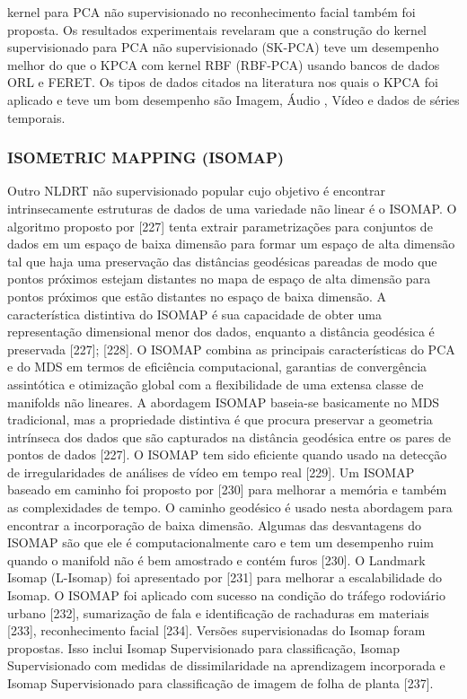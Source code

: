 kernel para PCA não supervisionado no reconhecimento facial também foi proposta. Os resultados experimentais revelaram que a construção do kernel supervisionado para PCA não supervisionado (SK-PCA) teve um desempenho melhor do que o KPCA com kernel RBF (RBF-PCA) usando bancos de dados ORL e FERET. Os tipos de dados citados na literatura nos quais o KPCA foi aplicado e teve um bom desempenho são Imagem, Áudio , Vídeo e dados de séries temporais.

\subsubsection{ISOMETRIC MAPPING (ISOMAP)}

Outro NLDRT não supervisionado popular cujo objetivo é encontrar intrinsecamente estruturas de dados de uma variedade não linear é o ISOMAP. O algoritmo proposto por [227] tenta extrair parametrizações para conjuntos de dados em um espaço de baixa dimensão para formar um espaço de alta dimensão tal que haja uma preservação das distâncias geodésicas pareadas de modo que pontos próximos estejam distantes no mapa de espaço de alta dimensão para pontos próximos que estão distantes no espaço de baixa dimensão. A característica distintiva do ISOMAP é sua capacidade de obter uma representação dimensional menor dos dados, enquanto a distância geodésica é preservada [227]; [228]. O ISOMAP combina as principais características do PCA e do MDS em termos de eficiência computacional, garantias de convergência assintótica e otimização global com a flexibilidade de uma extensa classe de manifolds não lineares. A abordagem ISOMAP baseia-se basicamente no MDS tradicional, mas a propriedade distintiva é que procura preservar a geometria intrínseca dos dados que são capturados na distância geodésica entre os pares de pontos de dados [227]. O ISOMAP tem sido eficiente quando usado na detecção de irregularidades de análises de vídeo em tempo real [229]. Um ISOMAP baseado em caminho foi proposto por [230] para melhorar a memória e também as complexidades de tempo. O caminho geodésico é usado nesta abordagem para encontrar a incorporação de baixa dimensão. Algumas das desvantagens do ISOMAP são que ele é computacionalmente caro e tem um desempenho ruim quando o manifold não é bem amostrado e contém furos [230]. O Landmark Isomap (L-Isomap) foi apresentado por [231] para melhorar a escalabilidade do Isomap. O ISOMAP foi aplicado com sucesso na condição do tráfego rodoviário urbano [232], sumarização de fala e identificação de rachaduras em materiais [233], reconhecimento facial [234]. Versões supervisionadas do Isomap foram propostas. Isso inclui Isomap Supervisionado para classificação, Isomap Supervisionado com medidas de dissimilaridade na aprendizagem incorporada e Isomap Supervisionado para classificação de imagem de folha de planta [237].

